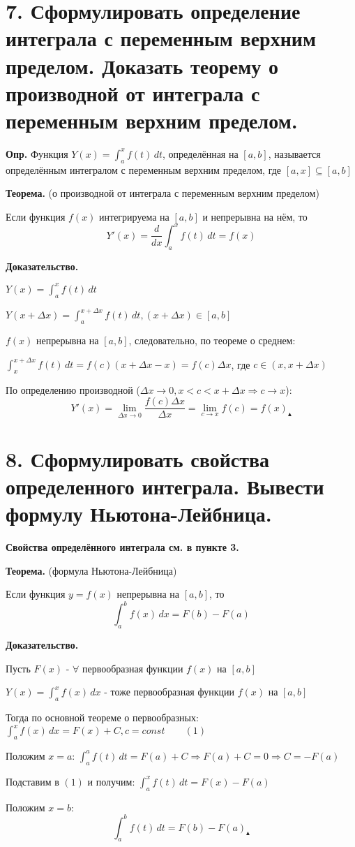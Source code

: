 \documentclass[11pt]{article}
\begin{document}
\section*{7. Сформулировать определение интеграла с переменным верхним пределом. Доказать теорему о производной от интеграла с переменным верхним пределом.}
\par\textbf{Опр.} Функция $ {Y(x) = \int_a^x f(t) \, dt}$, определённая на $[a, b]$, называется определённым интегралом с переменным верхним пределом, где $[a, x] \subseteq [a, b]$
\par\textbf{Теорема.} (о производной от интеграла с переменным верхним пределом)
\par Если функция $f(x)$ интегрируема на $[a, b]$ и непрерывна на нём, то $$Y'(x) = \frac{d}{dx} \int_{a}^x f(t) \, dt = f(x)$$
\par\textbf{Доказательство.}
\par $Y(x) = \int_{a}^x f(t) \, dt$
\par $Y(x + \Delta x) = \int_{a}^{x + \Delta x} f(t) \, dt, (x + \Delta x) \in [a, b]$
\par $f(x)$ непрерывна на $[a, b]$, следовательно, по теореме о среднем:
\par $\int_{x}^{x + \Delta x} f(t) \, dt = f(c) (x + \Delta x - x) = f(c) \Delta x$, где $c \in (x, x + \Delta x)$
\par По определению производной ($\Delta x \to 0, x < c < x + \Delta x \Rightarrow c \to x$):
$$Y'(x) = \lim_{\Delta x \to 0} \frac{{f(c) \Delta x}}{\Delta x} = \lim_{ c \to x } f(c) = f(x) _\blacktriangle$$

\section*{8. Сформулировать свойства определенного интеграла. Вывести формулу Ньютона-Лейбница.}
\par\textbf{Свойства определённого интеграла см. в пункте 3.}
\par\textbf{Теорема.} (формула Ньютона-Лейбница)
\par Если функция $y = f(x)$ непрерывна на $[a, b]$, то $$\int_{a}^b f(x) \, dx = F(b) - F(a)$$
\par\textbf{Доказательство.}
\par Пусть $F(x)$ - $\forall$ первообразная функции $f(x)$ на $[a, b]$
\par $Y(x) = \int_{a}^x f(x) \, dx$ - тоже первообразная функции $f(x)$ на $[a, b]$
\par Тогда по основной теореме о первообразных: $\int_{a}^x f(x) \, dx = F(x) + C, c =const \qquad(1)$
\par Положим $x = a$: $\int_{a}^a f(t) \, dt = F(a) + C \Rightarrow F(a) + C = 0 \Rightarrow C = -F(a)$
\par Подставим в $(1)$ и получим: $\int_{a}^x f(t) \, dt = F(x) - F(a)$
\par Положим $x = b$: $$\int_{a}^b f(t) \, dt = F(b) - F(a) _{\blacktriangle}$$
\end{document}
